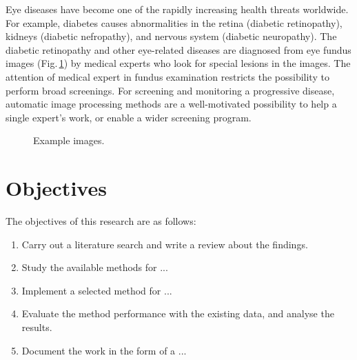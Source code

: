 \documentclass[11pt,a4,notitlepage]{article}
\begin{document}
Eye diseases have become one of the rapidly increasing health threats worldwide.
For example, diabetes causes abnormalities in the retina (diabetic retinopathy),
kidneys (diabetic nefropathy), and nervous system (diabetic neuropathy). The
diabetic retinopathy and other eye-related diseases are diagnosed from eye
fundus images (Fig.\,\ref{fig:images}) by medical experts who look for special
lesions in the images. The attention of medical expert in fundus examination
restricts the possibility to perform broad screenings. For screening and
monitoring a progressive disease, automatic image processing methods are a
well-motivated possibility to help a single expert's work, or enable a wider
screening program.
%
\begin{figure}[!ht] \centering
%
%
%
\caption{Example images.} \label{fig:images}
%
\end{figure}


\section{Objectives}

The objectives of this research are as follows:
%
\begin{enumerate}
%
\item Carry out a literature search and write a review about the findings.
%
\item Study the available methods for ...
%
\item Implement a selected method for ...
%
\item Evaluate the method performance with the existing data, and analyse the
results.
%
\item Document the work in the form of a ...
%
\end{enumerate}
\end{document}
